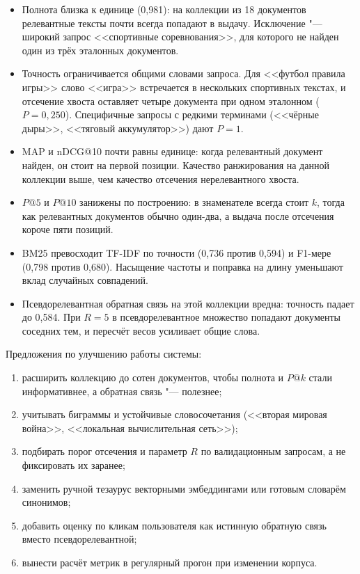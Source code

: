 \begin{itemize}
	\item Полнота близка к единице (0,981): на коллекции из 18 документов релевантные тексты почти всегда попадают в выдачу. Исключение "--- широкий запрос <<спортивные соревнования>>, для которого не найден один из трёх эталонных документов.
	\item Точность ограничивается общими словами запроса. Для <<футбол правила игры>> слово <<игра>> встречается в нескольких спортивных текстах, и отсечение хвоста оставляет четыре документа при одном эталонном ($P = 0{,}250$). Специфичные запросы с редкими терминами (<<чёрные дыры>>, <<тяговый аккумулятор>>) дают $P = 1$.
	\item MAP и nDCG@10 почти равны единице: когда релевантный документ найден, он стоит на первой позиции. Качество ранжирования на данной коллекции выше, чем качество отсечения нерелевантного хвоста.
	\item $P@5$ и $P@10$ занижены по построению: в знаменателе всегда стоит $k$, тогда как релевантных документов обычно один-два, а выдача после отсечения короче пяти позиций.
	\item BM25 превосходит TF-IDF по точности (0,736 против 0,594) и F1-мере (0,798 против 0,680). Насыщение частоты и поправка на длину уменьшают вклад случайных совпадений.
	\item Псевдорелевантная обратная связь на этой коллекции вредна: точность падает до 0,584. При $R = 5$ в псевдорелевантное множество попадают документы соседних тем, и пересчёт весов усиливает общие слова.
\end{itemize}

Предложения по улучшению работы системы:

\begin{enumerate}
	\item расширить коллекцию до сотен документов, чтобы полнота и $P@k$ стали информативнее, а обратная связь "--- полезнее;
	\item учитывать биграммы и устойчивые словосочетания (<<вторая мировая война>>, <<локальная вычислительная сеть>>);
	\item подбирать порог отсечения и параметр $R$ по валидационным запросам, а не фиксировать их заранее;
	\item заменить ручной тезаурус векторными эмбеддингами или готовым словарём синонимов;
	\item добавить оценку по кликам пользователя как истинную обратную связь вместо псевдорелевантной;
	\item вынести расчёт метрик в регулярный прогон при изменении корпуса.
\end{enumerate}

